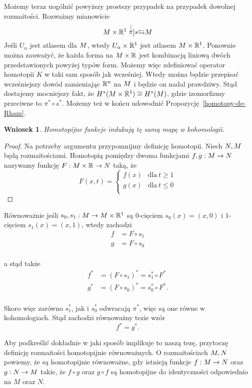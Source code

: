 \documentclass[licencjacka]{pracamgr}
\theoremstyle{definition}
\theoremstyle{definition}
\theoremstyle{plain}
\theoremstyle{plain}
\theoremstyle{plain}
\theoremstyle{plain}
\newtheorem{wniosek}{Wniosek}[section]
\def\M{\ensuremath M}
\def\N{\ensuremath N}
\def\R{\ensuremath\mathbb{R}}
\begin{document}
Możemy teraz uogólnić powyższy prostszy przypadek na przypadek dowolnej
rozmaitości. Rozważmy mianowicie
\[
 \M \times \R^1 \stackrel[\pi]{s}{\leftrightarrows} \M
\]
Jeśli ${U_\alpha}$ jest atlasem dla $\M$, wtedy ${U_\alpha \times \R^1}$ jest
atlasem $\M \times \R^1$. Ponownie można zauważyć, że każda forma na $\M \times
\R$ jest kombinacją liniową dwóch przedstawionych powyżej typów form.  Możemy
więc zdefiniować operator homotopii $K$ w taki sam sposób jak wcześniej.  Wtedy
można będzie przepisać wcześniejszy dowód zamieniając $\R^n$ na $\M$ i będzie
on nadal prawdziwy. Stąd dostajemy mocniejszy fakt, że $ H^\ast( \M \times
\R^1) \cong H^\ast( \M) $, gdzie izomorfizmy przeciwne to $\pi^\ast \circ
s^\ast$. Możemy też w końcu udowodnić Propozycję~\ref{homotopy-de-Rham}.

\begin{wniosek}
Homotopijne funkcje indukują tę samą mapę w kohomologii.
\end{wniosek}
\begin{proof}
Na potrzeby argumentu przypomnijmy definicję homotopii.  Niech $\N, \M$ będą
rozmaitościami.  Homotopią pomiędzy dwoma funkcjami $f,g: \M \rightarrow \N$
nazywamy funkcję $F: \M \times \R \rightarrow \N$ taką, że
\[
F(x,t) = 
\begin{cases}
f(x) & \text{dla}~t \geq 1 \\
g(x) & \text{dla}~t \leq 0 \\
\end{cases}
\]
\end{proof}
Równoważnie jeśli $s_0,s_1: \M \rightarrow  \M \times \R^1$ są $0$-cięciem
$s_0(x) = (x, 0)$ i $1$-cięciem $s_1(x) = (x,1)$, wtedy zachodzi
\begin{align*}
f &= F \circ s_1 \\
g &= F \circ s_0 \\
\end{align*}

a stąd także
\begin{align*}
f^\ast &= (F \circ s_1)^\ast = s_1^\ast \circ F^\ast \\
g^\ast &= (F \circ s_0)^\ast = s_0^\ast \circ F^\ast. \\
\end{align*}

Skoro więc zarówno $s_1^\ast$, jak i $s_0^\ast$ odwracają $\pi^\ast$, więc
są one równe w kohomologiach. Stąd zachodzi równoważny tezie wzór
\[
f^\ast = g^\ast.
\] 

Aby podkreślić dokładnie w jaki sposób implikuje to naszą tezę, przytoczę
definicję rozmaitości homotopijnie równoważnych. O rozmaitościach $\M, \N$
powiemy, że są homotopijnie równoważne, gdy istnieją funkcje
$f: \M \rightarrow \N$ oraz $g: \N \rightarrow \M$ takie, że
$f \circ g$ oraz $g \circ f$ są homotopijne do identyczności odpowiednio
na $M$ oraz $N$. \\
\end{document}
